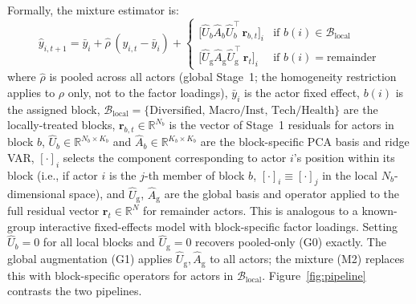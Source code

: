 \documentclass[11pt,a4paper]{article}
\newcommand{\R}{\mathbb{R}}
\begin{document}
Formally, the mixture estimator is:
\begin{equation}
\hat{y}_{i,t+1} = \bar{y}_i + \hat{\rho}\,(y_{i,t} - \bar{y}_i) +
\begin{cases}
\bigl[\hat{U}_b \hat{A}_b \hat{U}_b^\top\, \mathbf{r}_{b,t}\bigr]_i & \text{if } b(i) \in \mathcal{B}_{\mathrm{local}} \\[3pt]
\bigl[\hat{U}_{\mathrm{g}} \hat{A}_{\mathrm{g}} \hat{U}_{\mathrm{g}}^\top\, \mathbf{r}_t\bigr]_i & \text{if } b(i) = \text{remainder}
\end{cases}
\label{eq:mixture}
\end{equation}
where $\hat{\rho}$ is pooled across all actors (global Stage~1; the homogeneity restriction applies to $\rho$ only, not to the factor loadings), $\bar{y}_i$ is the actor fixed effect, $b(i)$ is the assigned block, $\mathcal{B}_{\mathrm{local}} = \{\text{Diversified, Macro/Inst, Tech/Health}\}$ are the locally-treated blocks, $\mathbf{r}_{b,t} \in \R^{N_b}$ is the vector of Stage~1 residuals for actors in block $b$, $\hat{U}_b \in \R^{N_b \times K_b}$ and $\hat{A}_b \in \R^{K_b \times K_b}$ are the block-specific PCA basis and ridge VAR, $[\cdot]_i$ selects the component corresponding to actor $i$'s position within its block (i.e., if actor $i$ is the $j$-th member of block $b$, $[\cdot]_i \equiv [\cdot]_j$ in the local $N_b$-dimensional space), and $\hat{U}_{\mathrm{g}}$, $\hat{A}_{\mathrm{g}}$ are the global basis and operator applied to the full residual vector $\mathbf{r}_t \in \R^N$ for remainder actors. This is analogous to a known-group interactive fixed-effects model \citep{bai2009panel} with block-specific factor loadings. Setting $\hat{U}_b = 0$ for all local blocks and $\hat{U}_{\mathrm{g}} = 0$ recovers pooled-only (G0) exactly. The global augmentation (G1) applies $\hat{U}_{\mathrm{g}}, \hat{A}_{\mathrm{g}}$ to all actors; the mixture (M2) replaces this with block-specific operators for actors in $\mathcal{B}_{\mathrm{local}}$. Figure~\ref{fig:pipeline} contrasts the two pipelines.
\end{document}
